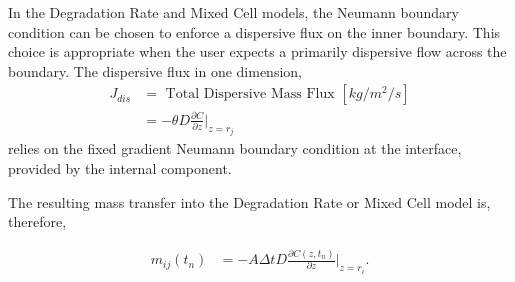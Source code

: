 

In the Degradation Rate and Mixed Cell models, the Neumann boundary condition 
can be chosen to enforce a dispersive flux on the inner boundary. This choice 
is appropriate when the user expects a primarily dispersive flow across the 
boundary.
The dispersive flux in one dimension, 
\begin{align}
      J_{dis} &= \mbox{ Total Dispersive Mass Flux }[kg/m^2/s]\nonumber\\
      &= -\theta D\frac{\partial C}{\partial z}\Big|_{z=r_j} \nonumber
\end{align}
relies on the fixed gradient Neumann boundary condition at the interface, 
provided by the internal component. 

The resulting mass transfer into the Degradation Rate or Mixed Cell model is, 
therefore, 

\begin{align}
m_{ij}(t_n) &= - A\Delta t D \frac{\partial C(z,t_n)}{\partial z}|_{z=r_i}.
\end{align}
